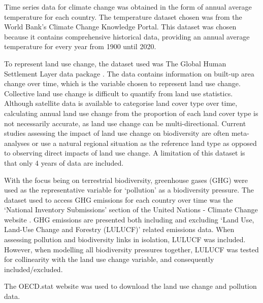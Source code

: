 \documentclass[11pt, a4paper, titlepage]{article}
\begin{document}
	Time series data for climate change was obtained in the form of annual average temperature for each country. The temperature dataset chosen was from the World Bank's Climate Change Knowledge Portal. This dataset was chosen because it contains comprehensive historical data, providing an annual average temperature for every year from 1900 until 2020. \newline
	
	To represent land use change, the dataset used was The Global Human Settlement Layer data package \citep{JRC117104}. The data contains information on built-up area change over time, which is the variable chosen to represent land use change. Collective land use change is difficult to quantify from land use statistics. Although satellite data is available to categorise land cover type over time, calculating annual land use change from the proportion of each land cover type is not necessarily accurate, as land use change can be multi-directional. Current studies assessing the impact of land use change on biodiversity are often meta-analyses or use a natural regional situation as the reference land type \citep{de2013land} as opposed to observing direct impacts of land use change. A limitation of this dataset is that only 4 years of data are included. \newline
	
	With the focus being on terrestrial biodiversity, greenhouse gases (GHG) were used as the representative variable for `pollution' as a biodiversity pressure. The dataset used to access GHG emissions for each country over time was the `National Inventory Submissions' section of the United Nations - Climate Change website \citep{united nations}. GHG emissions are presented both including and excluding `Land Use, Land-Use Change and Forestry (LULUCF)' related emissions data. When assessing pollution and biodiversity links in isolation, LULUCF was included. However, when modelling all biodiversity pressures together, LULUCF was tested for collinearity with the land use change variable, and consequently included/excluded. \newline
	
	The OECD.stat website was used to download the land use change and pollution data. \newline
	
\end{document}
